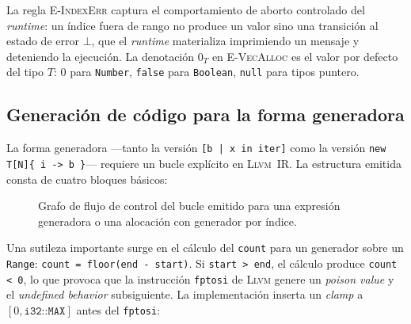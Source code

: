 \documentclass[11pt,a4paper,oneside,openany]{report}
\newcommand{\code}[1]{\texttt{#1}}
\newcommand{\llvm}{\textsc{Llvm}}
\begin{document}
La regla \textsc{E-IndexErr} captura el comportamiento de aborto
controlado del \textit{runtime}: un índice fuera de rango no produce un
valor sino una transición al estado de error $\bot$, que el
\textit{runtime} materializa imprimiendo un mensaje y deteniendo la
ejecución. La denotación $0_T$ en \textsc{E-VecAlloc} es el valor por
defecto del tipo $T$: $0$ para \code{Number}, \code{false} para
\code{Boolean}, \code{null} para tipos puntero.

\subsection{Generación de código para la forma generadora}

La forma generadora ---tanto la versión \code{[b | x in iter]} como la
versión \code{new T[N]\{ i -> b \}}--- requiere un bucle explícito en
\llvm{}~IR. La estructura emitida consta de cuatro bloques básicos:

\begin{figure}[H]
\centering
{}
\caption{Grafo de flujo de control del bucle emitido para una expresión
  generadora o una alocación con generador por índice.}
\label{fig:cfg-gen}
\end{figure}

Una sutileza importante surge en el cálculo del \code{count} para un
generador sobre un \code{Range}: \code{count = floor(end - start)}. Si
\code{start > end}, el cálculo produce \code{count < 0}, lo que provoca
que la instrucción \code{fptosi} de \llvm{} genere un \emph{poison value}
y el \emph{undefined behavior} subsiguiente. La implementación inserta un
\emph{clamp} a $[0, \texttt{i32::MAX}]$ antes del \code{fptosi}:
\end{document}

